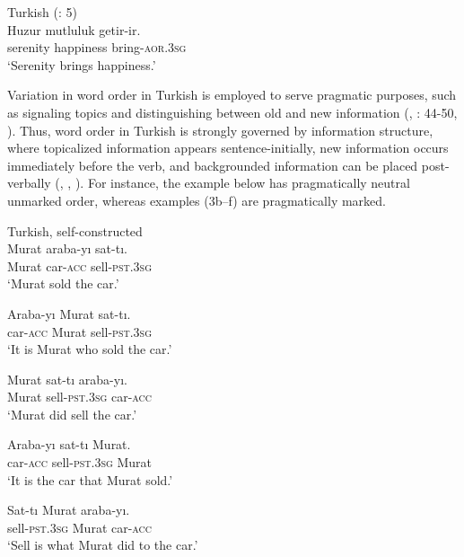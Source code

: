 \ea%
  \label{ex:key:2} Turkish (\citealt{Erguvanli1984}: 5)\\
\gll Huzur     mutluluk   getir-ir.\\
serenity          happiness         bring\textsc{-aor.3\textsc{sg}}\\
\glt ‘Serenity brings happiness.’
  \z

Variation in word order in Turkish is employed to serve pragmatic purposes, such as signaling topics and distinguishing between old and new information (\citealt{Erku1983}, \citealt{Erguvanli1984}: 44-50, \citealt{Issever2003}). Thus, word order in Turkish is strongly governed by information structure, where topicalized information appears sentence-initially, new information occurs immediately before the verb, and backgrounded information can be placed post-verbally (\citealt{Erku1983}, \citealt{Erguvanli1984}, \citealt{Hoffman1995}). For instance, the example  below has pragmatically neutral unmarked order, whereas examples (3b--f) are pragmatically marked.



\ea\label{ex:key:3} Turkish, self-constructed \\
\ea\label{ex:key:3a}
\gll Murat     araba-yı   sat-tı.\\
Murat    car-\textsc{acc}  sell-\textsc{pst}.3\textsc{sg}\\
\glt ‘Murat sold the car.’

\ex\label{ex:key:3b}
\gll Araba-yı  Murat    sat-tı.\\
car-\textsc{acc}  Murat    sell-\textsc{pst}.3\textsc{sg}\\
\glt ‘It is Murat who sold the car.’

\ex\label{ex:key:3c}
\gll Murat    sat-tı    araba-yı.\\
Murat    sell-\textsc{pst}.3\textsc{sg}  car-\textsc{acc}\\
\glt ‘Murat did sell the car.’

\ex\label{ex:key:3d}
\gll Araba-yı   sat-tı     Murat.\\
car-\textsc{acc}  sell-\textsc{pst}.3\textsc{sg} Murat\\
\glt ‘It is the car that Murat sold.’

\ex\label{ex:key:3e}
\gll Sat-tı     Murat     araba-yı.\\
sell-\textsc{pst}.3\textsc{sg}  Murat    car-\textsc{acc}\\
\glt ‘Sell is what Murat did to the car.’

